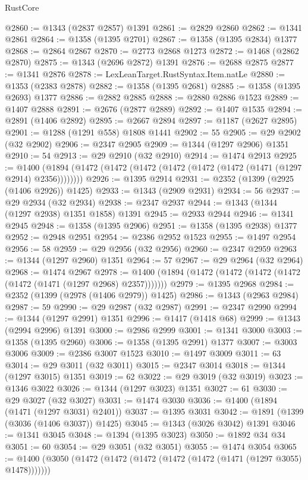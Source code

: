 \begin{lexlean}{RustCore}
\begin{coremodule}
@2860 := @1343 (@2837 @2857) @1391
@2861 := @2829 @2860
@2862 := @1341 @2861
@2864 := @1358 (@1395 @2701)
@2867 := @1358 (@1395 @2834) @1377
@2868 := @2864 @2867
@2870 := @2773 @2868 @1273
@2872 := @1468 (@2862 @2870)
@2875 := @1343 (@2696 @2872) @1391
@2876 := @2688 @2875
@2877 := @1341 @2876
@2878 := LexLeanTarget.RustSyntax.Item.natLe
@2880 := @1353 (@2383 @2878)
@2882 := @1358 (@1395 @2681)
@2885 := @1358 (@1395 @2693) @1377
@2886 := @2882 @2885
@2888 := @2880 @2886 @1523
@2889 := @1407 @2888
@2891 := @2676 (@2877 @2889)
@2892 := @1407 @1535
@2894 := @2891 (@1406 @2892)
@2895 := @2667 @2894
@2897 := @1187 (@2627 @2895)
@2901 := @1288 (@1291 @558) @1808 @1441
@2902 := 55
@2905 := @29 @2902 (@32 @2902)
@2906 := @2347 @2905
@2909 := @1344 (@1297 @2906) @1351
@2910 := 54
@2913 := @29 @2910 (@32 @2910)
@2914 := @1474 @2913
@2925 := @1400 (@1894 (@1472 (@1472 (@1472 (@1472 (@1472 (@1472 (@1471 (@1297 @2914) @2356))))))))
@2926 := @1395 @2914
@2931 := @2352 (@1399 (@2925 (@1406 @2926)) @1425)
@2933 := @1343 (@2909 @2931)
@2934 := 56
@2937 := @29 @2934 (@32 @2934)
@2938 := @2347 @2937
@2944 := @1343 (@1344 (@1297 @2938) @1351 @1858) @1391
@2945 := @2933 @2944
@2946 := @1341 @2945
@2948 := @1358 (@1395 @2906)
@2951 := @1358 (@1395 @2938) @1377
@2952 := @2948 @2951
@2954 := @2386 @2952 @1523
@2955 := @1497 @2954
@2956 := 58
@2959 := @29 @2956 (@32 @2956)
@2960 := @2347 @2959
@2963 := @1344 (@1297 @2960) @1351
@2964 := 57
@2967 := @29 @2964 (@32 @2964)
@2968 := @1474 @2967
@2978 := @1400 (@1894 (@1472 (@1472 (@1472 (@1472 (@1472 (@1471 (@1297 @2968) @2357)))))))
@2979 := @1395 @2968
@2984 := @2352 (@1399 (@2978 (@1406 @2979)) @1425)
@2986 := @1343 (@2963 @2984)
@2987 := 59
@2990 := @29 @2987 (@32 @2987)
@2991 := @2347 @2990
@2994 := @1344 (@1297 @2991) @1351
@2996 := @1417 (@1418 @68)
@2999 := @1343 (@2994 @2996) @1391
@3000 := @2986 @2999
@3001 := @1341 @3000
@3003 := @1358 (@1395 @2960)
@3006 := @1358 (@1395 @2991) @1377
@3007 := @3003 @3006
@3009 := @2386 @3007 @1523
@3010 := @1497 @3009
@3011 := 63
@3014 := @29 @3011 (@32 @3011)
@3015 := @2347 @3014
@3018 := @1344 (@1297 @3015) @1351
@3019 := 62
@3022 := @29 @3019 (@32 @3019)
@3023 := @1346 @3022
@3026 := @1344 (@1297 @3023) @1351
@3027 := 61
@3030 := @29 @3027 (@32 @3027)
@3031 := @1474 @3030
@3036 := @1400 (@1894 (@1471 (@1297 @3031) @2401))
@3037 := @1395 @3031
@3042 := @1891 (@1399 (@3036 (@1406 @3037)) @1425)
@3045 := @1343 (@3026 @3042) @1391
@3046 := @1341 @3045
@3048 := @1394 (@1395 @3023)
@3050 := @1892 @34 @34
@3051 := 60
@3054 := @29 @3051 (@32 @3051)
@3055 := @1474 @3054
@3065 := @1400 (@3050 (@1472 (@1472 (@1472 (@1472 (@1472 (@1471 (@1297 @3055) @1478)))))))

\end{coremodule}
\end{lexlean}

